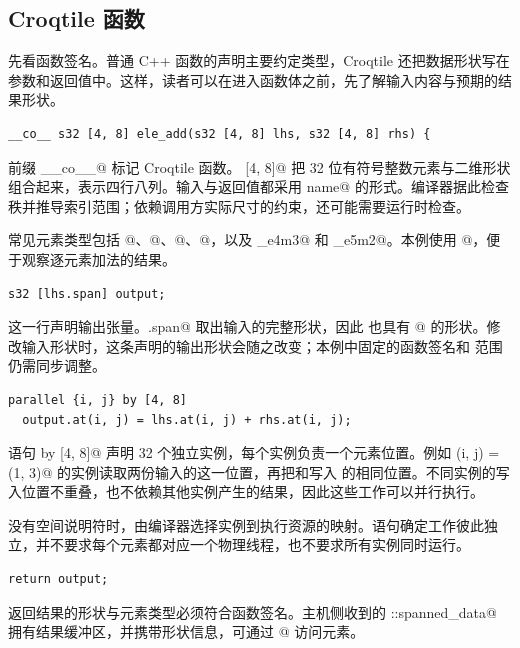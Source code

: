 \subsection*{Croqtile 函数}

先看函数签名。普通 C++ 函数的声明主要约定类型，Croqtile 还把数据形状写在参数和返回值中。这样，读者可以在进入函数体之前，先了解输入内容与预期的结果形状。

\begin{lstlisting}[language=croqtile,caption={核函数签名}]
__co__ s32 [4, 8] ele_add(s32 [4, 8] lhs, s32 [4, 8] rhs) {
\end{lstlisting}

前缀 \co@__co__@ 标记 Croqtile 函数。 [4, 8]@ 把 32 位有符号整数元素与二维形状组合起来，表示四行八列。输入与返回值都采用 \co@type [shape] name@ 的形式。编译器据此检查秩并推导索引范围；依赖调用方实际尺寸的约束，还可能需要运行时检查。

常见元素类型包括 @、@、@、@，以及 _e4m3@ 和 _e5m2@。本例使用 @，便于观察逐元素加法的结果。

\begin{lstlisting}[language=croqtile,caption={分配输出}]
s32 [lhs.span] output;
\end{lstlisting}

这一行声明输出张量。\co@lhs.span@ 取出输入的完整形状，因此 \co@output@ 也具有 \co@[4, 8]@ 的形状。修改输入形状时，这条声明的输出形状会随之改变；本例中固定的函数签名和 \co@parallel@ 范围仍需同步调整。

\begin{lstlisting}[language=croqtile,caption={并行函数体}]
parallel {i, j} by [4, 8]
  output.at(i, j) = lhs.at(i, j) + rhs.at(i, j);
\end{lstlisting}

语句  by [4, 8]@ 声明 32 个独立实例，每个实例负责一个元素位置。例如 \co@(i, j) = (1, 3)@ 的实例读取两份输入的这一位置，再把和写入 \co@output@ 的相同位置。不同实例的写入位置不重叠，也不依赖其他实例产生的结果，因此这些工作可以并行执行。

没有空间说明符时，由编译器选择实例到执行资源的映射。语句确定工作彼此独立，并不要求每个元素都对应一个物理线程，也不要求所有实例同时运行。

\begin{lstlisting}[language=croqtile,caption={返回结果}]
return output;
\end{lstlisting}

返回结果的形状与元素类型必须符合函数签名。主机侧收到的 \co@croq::spanned_data@ 拥有结果缓冲区，并携带形状信息，可通过 \co@[i][j]@ 访问元素。
